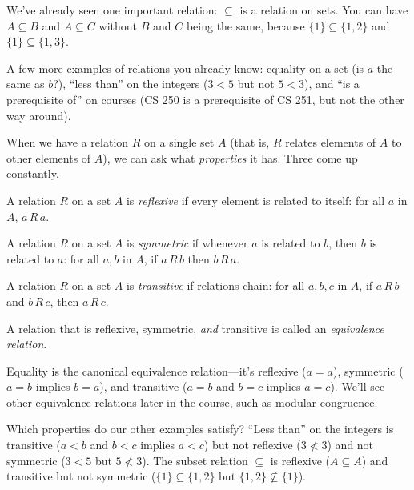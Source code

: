 \documentclass[11pt]{article}
\begin{document}
We've already seen one important relation: $\subseteq$ is a relation on sets. You can have $A \subseteq B$ and $A \subseteq C$ without $B$ and $C$ being the same, because $\{1\} \subseteq \{1,2\}$ and $\{1\} \subseteq \{1,3\}$.

A few more examples of relations you already know: equality on a set (is $a$ the same as $b$?), ``less than'' on the integers ($3 < 5$ but not $5 < 3$), and ``is a prerequisite of'' on courses (CS 250 is a prerequisite of CS 251, but not the other way around).

When we have a relation $R$ on a single set $A$ (that is, $R$ relates elements of $A$ to other elements of $A$), we can ask what \emph{properties} it has. Three come up constantly.

\begin{definition}[Reflexive]
A relation $R$ on a set $A$ is \emph{reflexive} if every element is related to itself: for all $a$ in $A$, $a \, R \, a$.
\end{definition}

\begin{definition}[Symmetric]
A relation $R$ on a set $A$ is \emph{symmetric} if whenever $a$ is related to $b$, then $b$ is related to $a$: for all $a, b$ in $A$, if $a \, R \, b$ then $b \, R \, a$.
\end{definition}

\begin{definition}[Transitive]
A relation $R$ on a set $A$ is \emph{transitive} if relations chain: for all $a, b, c$ in $A$, if $a \, R \, b$ and $b \, R \, c$, then $a \, R \, c$.
\end{definition}

\begin{definition}
A relation that is reflexive, symmetric, \emph{and} transitive is called an \emph{equivalence relation}.
\end{definition}

Equality is the canonical equivalence relation---it's reflexive ($a = a$), symmetric ($a = b$ implies $b = a$), and transitive ($a = b$ and $b = c$ implies $a = c$). We'll see other equivalence relations later in the course, such as modular congruence.

Which properties do our other examples satisfy? ``Less than'' on the integers is transitive ($a < b$ and $b < c$ implies $a < c$) but not reflexive ($3 \not< 3$) and not symmetric ($3 < 5$ but $5 \not< 3$). The subset relation $\subseteq$ is reflexive ($A \subseteq A$) and transitive but not symmetric ($\{1\} \subseteq \{1,2\}$ but $\{1,2\} \not\subseteq \{1\}$).
\end{document}
